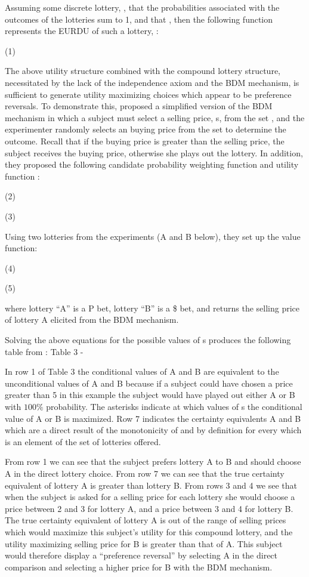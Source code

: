 \documentclass[../main.tex]{subfiles}
\begin{document}
Assuming some discrete lottery, , that the probabilities associated with the outcomes of the lotteries sum to 1, and that , then the following function represents the  EURDU of such a lottery, \textcite{Karni1987}:

(1)	

The above utility structure combined with the compound lottery structure, necessitated by the lack of the independence axiom and the BDM mechanism, is sufficient to generate utility maximizing choices which appear to be preference reversals. To demonstrate this, \textcite{Karni1987} proposed a simplified version of the BDM mechanism in which a subject must select a selling price, s, from the set , and the experimenter randomly selects an buying price from the set  to determine the outcome.
Recall that if the buying price is greater than the selling price, the subject receives the buying price, otherwise she plays out the lottery.
In addition, they proposed the following candidate probability weighting function and utility function :

(2)	

(3)	

Using two lotteries from the \textcite{Grether1979} experiments (A and B below), they set up the value function:

(4)	

(5)	

where lottery \enquote{A} is a P bet,  lottery \enquote{B} is a \$ bet, and  returns the selling price of lottery A elicited from the BDM mechanism.

Solving the above equations for the possible values of s produces the following table from \textcite[679]{Karni1987}:
Table 3 - \textcite{Karni1987}


In row 1 of Table 3 the conditional values of A and B are equivalent to the unconditional values  of A and B because if a subject could have chosen a price greater than 5 in this example the subject would have played out either A or B with $100\%$ probability.
The asterisks indicate at which values of s the conditional value of A or B is maximized.
Row 7 indicates the certainty equivalents A and B which are a direct result of the monotonicity of  and by definition  for every  which is an element of the set of lotteries offered. 

From row 1 we can see that the subject prefers lottery A to B and should choose A in the direct lottery choice.
From row 7 we can see that the true certainty equivalent of lottery A is greater than lottery B.
From rows 3 and 4 we see that when the subject is asked for a selling price for each lottery she would choose a price between 2 and 3 for lottery A, and a price between 3 and 4 for lottery B.
The true certainty equivalent of lottery A is out of the range of selling prices which would maximize this subject's utility for this compound lottery, and the utility maximizing selling price for B is greater than that of A.
This subject would therefore display a \enquote{preference reversal} by selecting A in the direct comparison and selecting a higher price for B with the BDM mechanism.
\end{document}

